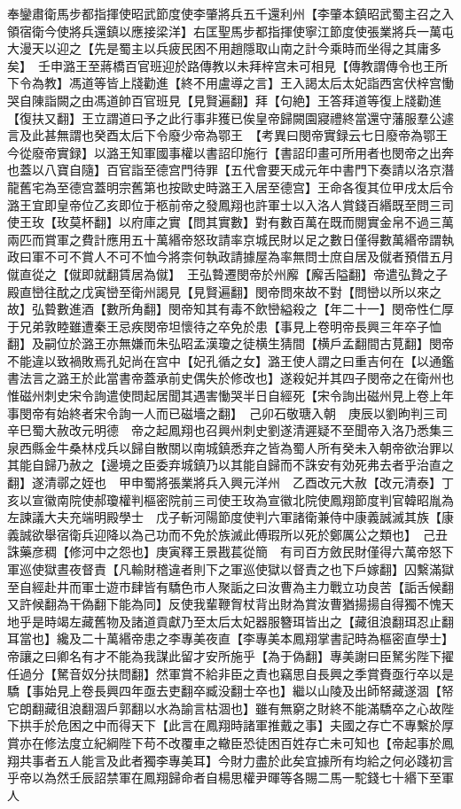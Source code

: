 奉鑾肅衛馬步都指揮使昭武節度使李肇將兵五千還利州【李肇本鎮昭武蜀主召之入領宿衛今使將兵還鎮以應接梁洋】右匡聖馬步都指揮使寧江節度使張業將兵一萬屯大漫天以迎之【先是蜀主以兵疲民困不用趙隱取山南之計今乘時而坐得之其庸多矣】　壬申潞王至蔣橋百官班迎於路傳教以未拜梓宫未可相見【傳教謂傳令也王所下令為教】馮道等皆上牋勸進【終不用盧導之言】王入謁太后太妃詣西宮伏梓宫慟哭自陳詣闕之由馮道帥百官班見【見賢遍翻】拜【句絶】王答拜道等復上牋勸進【復扶又翻】王立謂道曰予之此行事非獲已俟皇帝歸闕園寢禮終當還守藩服羣公遽言及此甚無謂也癸酉太后下令廢少帝為鄂王　【考異曰閔帝實録云七日廢帝為鄂王今從廢帝實録】以潞王知軍國事權以書詔印施行【書詔印畫可所用者也閔帝之出奔也蓋以八寶自隨】百官詣至德宫門待罪【五代會要天成元年中書門下奏請以洛京潛龍舊宅為至德宫蓋明宗舊第也按歐史時潞王入居至德宫】王命各復其位甲戌太后令潞王宜即皇帝位乙亥即位于柩前帝之發鳳翔也許軍士以入洛人賞錢百緡既至問三司使王玫【玫莫杯翻】以府庫之實【問其實數】對有數百萬在既而閱實金帛不過三萬兩匹而賞軍之費計應用五十萬緡帝怒玫請率京城民財以足之數日僅得數萬緡帝謂執政曰軍不可不賞人不可不恤今將柰何執政請據屋為率無問士庶自居及僦者預借五月僦直從之【僦即就翻賃居為僦】　王弘䞇遷閔帝於州廨【廨舌隘翻】帝遣弘贄之子殿直巒往酖之戊寅巒至衛州謁見【見賢遍翻】閔帝問來故不對【問巒以所以來之故】弘䞇數進酒【數所角翻】閔帝知其有毒不飲巒縊殺之【年二十一】閔帝性仁厚于兄弟敦睦雖遭秦王忌疾閔帝坦懷待之卒免於患【事見上卷明帝長興三年卒子恤翻】及嗣位於潞王亦無嫌而朱弘昭孟漢瓊之徒横生猜間【横戶孟翻間古莧翻】閔帝不能違以致禍敗焉孔妃尚在宫中【妃孔循之女】潞王使人謂之曰重吉何在【以通鑑書法言之潞王於此當書帝蓋承前史偶失於修改也】遂殺妃并其四子閔帝之在衛州也惟磁州刺史宋令詢遣使問起居聞其遇害慟哭半日自經死【宋令詢出磁州見上卷上年事閔帝有始終者宋令詢一人而已磁墻之翻】　己卯石敬瑭入朝　庚辰以劉昫判三司　辛巳蜀大赦改元明德　帝之起鳳翔也召興州刺史劉遂清遲疑不至聞帝入洛乃悉集三泉西縣金牛桑林戍兵以歸自散關以南城鎮悉弃之皆為蜀人所有癸未入朝帝欲治罪以其能自歸乃赦之【邊境之臣委弃城鎮乃以其能自歸而不誅安有効死弗去者乎治直之翻】遂清鄩之姪也　甲申蜀將張業將兵入興元洋州　乙酉改元大赦【改元清泰】丁亥以宣徽南院使郝瓊權判樞密院前三司使王玫為宣徽北院使鳳翔節度判官韓昭胤為左諫議大夫充端明殿學士　戊子斬河陽節度使判六軍諸衛兼侍中康義誠滅其族【康義誠欲舉宿衛兵迎降以為己功而不免於族滅此傅瑕所以死於鄭厲公之類也】　己丑誅藥彦稠【修河中之怨也】庚寅釋王景戡萇從簡　有司百方斂民財僅得六萬帝怒下軍巡使獄晝夜督責【凡輸財稽違者則下之軍巡使獄以督責之也下戶嫁翻】囚繫滿獄至自經赴井而軍士遊市肆皆有驕色市人聚詬之曰汝曹為主力戰立功良苦【詬舌候翻又許候翻為干偽翻下能為同】反使我輩鞭胷杖背出財為賞汝曹猶揚揚自得獨不愧天地乎是時竭左藏舊物及諸道貢獻乃至太后太妃器服簪珥皆出之【藏徂浪翻珥忍止翻耳當也】纔及二十萬緡帝患之李專美夜直【李專美本鳳翔掌書記時為樞密直學士】帝讓之曰卿名有才不能為我謀此留才安所施乎【為于偽翻】專美謝曰臣駑劣陛下擢任過分【駑音奴分扶問翻】然軍賞不給非臣之責也竊思自長興之季賞賚亟行卒以是驕【事始見上卷長興四年亟去吏翻卒臧没翻士卒也】繼以山陵及出師帑藏遂涸【帑它朗翻藏徂浪翻涸戶郭翻以水為諭言枯涸也】雖有無窮之財終不能滿驕卒之心故陛下拱手於危困之中而得天下【此言在鳳翔時諸軍推戴之事】夫國之存亡不專繫於厚賞亦在修法度立紀綱陛下苟不改覆車之轍臣恐徒困百姓存亡未可知也【帝起事於鳳翔共事者五人能言及此者獨李專美耳】今財力盡於此矣宜據所有均給之何必踐初言乎帝以為然壬辰詔禁軍在鳳翔歸命者自楊思權尹暉等各賜二馬一駝錢七十緡下至軍人